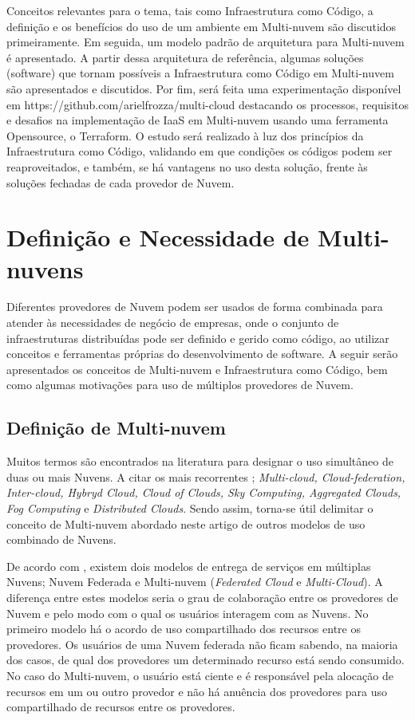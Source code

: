 \documentclass[12pt]{article}
\begin{document}
	    Conceitos relevantes para o tema, tais como Infraestrutura como Código, a definição e os benefícios do uso de um ambiente em Multi-nuvem são discutidos primeiramente. Em seguida, um modelo padrão de arquitetura para Multi-nuvem é apresentado. A partir dessa arquitetura de referência, algumas soluções (software) que tornam possíveis a Infraestrutura como Código em Multi-nuvem são apresentados e discutidos. Por fim, será feita uma experimentação disponível em https://github.com/arielfrozza/multi-cloud destacando os processos, requisitos e desafios na implementação de IaaS em Multi-nuvem usando uma ferramenta Opensource, o Terraform. O estudo será realizado à luz dos princípios da Infraestrutura como Código, validando em que condições os códigos podem ser reaproveitados, e também, se há vantagens no uso desta solução, frente às soluções fechadas de cada provedor de Nuvem.
		
	\section{Definição e Necessidade de Multi-nuvens}
	
	Diferentes provedores de Nuvem podem ser usados de forma combinada para atender às necessidades de negócio de empresas, onde o conjunto de infraestruturas distribuídas pode ser definido e gerido como código, ao utilizar conceitos e ferramentas próprias do desenvolvimento de software. A seguir serão apresentados os conceitos de Multi-nuvem e Infraestrutura como Código, bem como algumas motivações para uso de múltiplos provedores de Nuvem.
	
	\subsection{Definição de Multi-nuvem}
	
	Muitos termos são encontrados na literatura para designar o uso simultâneo de duas ou mais Nuvens. A citar os mais recorrentes \cite{Ferrer:2012}; \textit{Multi-cloud, Cloud-federation, Inter-cloud, Hybryd Cloud, Cloud of Clouds, Sky Computing, Aggregated Clouds, Fog Computing} e \textit{Distributed Clouds}. Sendo assim, torna-se útil delimitar o conceito de Multi-nuvem abordado neste artigo de outros modelos de uso combinado de Nuvens.
	
	De acordo com \cite{Ferrer:2012}, existem dois modelos de entrega de serviços em múltiplas Nuvens; Nuvem Federada e Multi-nuvem (\textit{Federated Cloud} e \textit{Multi-Cloud}). A diferença entre estes modelos seria o grau de colaboração entre os provedores de Nuvem e pelo modo com o qual os usuários interagem com as Nuvens. No primeiro modelo há o acordo de uso compartilhado dos recursos entre os provedores. Os usuários de uma Nuvem federada não ficam sabendo, na maioria dos casos, de qual dos provedores um determinado recurso está sendo consumido. No caso do Multi-nuvem, o usuário está ciente e é responsável pela alocação de recursos em um ou outro provedor e não há anuência dos provedores para uso compartilhado de recursos entre os provedores.
	
\end{document}
